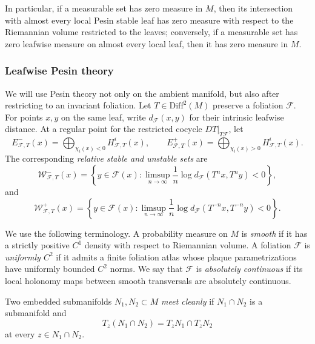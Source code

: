 \documentclass[11pt]{amsart}
\numberwithin{equation}{section}
\newcommand{\Diff}{\mathrm{Diff}}
\theoremstyle{plain}
\begin{document}
In particular, if a measurable set has zero measure in $M$, then its intersection
with almost every local Pesin stable leaf has zero measure with respect to the Riemannian volume restricted to the leaves; conversely, if
a measurable set has zero leafwise measure on almost every local leaf,
then it has zero measure in $M$.


\subsubsection{Leafwise Pesin theory}\mbox{}\par

We will use Pesin theory not only on the ambient manifold, but also after
restricting to an invariant foliation.  Let $T\in\Diff^2(M)$ preserve a
foliation $\mathcal F$.  For points $x,y$ on the same leaf, write
$d_{\mathcal F}(x,y)$ for their intrinsic leafwise distance.  At a regular
point for the restricted cocycle $DT|_{T\mathcal F}$, let
\[
E^-_{\mathcal F,T}(x)=\bigoplus_{\chi_i(x)<0}H^i_{\mathcal F,T}(x),
\qquad
E^+_{\mathcal F,T}(x)=\bigoplus_{\chi_i(x)>0}H^i_{\mathcal F,T}(x).
\]
The corresponding \emph{relative stable and unstable sets} are
\[
\mathcal W^-_{\mathcal F,T}(x)
 =\left\{y\in\mathcal F(x):
 \limsup_{n\to\infty}\frac1n
 \log d_{\mathcal F}(T^nx,T^ny)<0\right\},
\]
and
\[
\mathcal W^+_{\mathcal F,T}(x)
 =\left\{y\in\mathcal F(x):
 \limsup_{n\to\infty}\frac1n
 \log d_{\mathcal F}(T^{-n}x,T^{-n}y)<0\right\}.
\]

We use the following terminology.  A probability measure on $M$ is
\emph{smooth} if it has a strictly positive $C^1$ density with respect to
Riemannian volume.  A foliation $\mathcal F$ is \emph{uniformly $C^2$} if it
admits a finite foliation atlas whose plaque parametrizations have uniformly
bounded $C^2$ norms.  We say that $\mathcal F$ is \emph{absolutely
continuous} if its local holonomy maps between smooth transversals are
absolutely continuous. 

Two embedded submanifolds $N_1,N_2\subset M$ \emph{meet cleanly} if
$N_1\cap N_2$ is a submanifold and
\[
T_z(N_1\cap N_2)=T_zN_1\cap T_zN_2
\]
at every $z\in N_1\cap N_2$.
\end{document}
